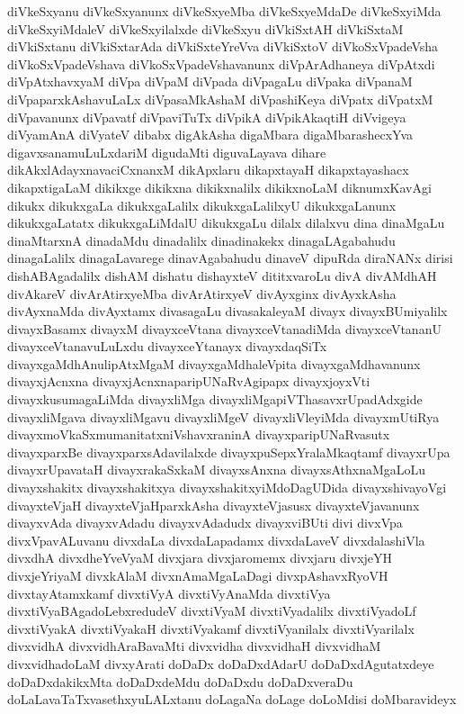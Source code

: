 {diVkeSxyanu
diVkeSxyanunx
diVkeSxyeMba
diVkeSxyeMdaDe
diVkeSxyiMda
diVkeSxyiMdaleV
diVkeSxyilalxde
diVkeSxyu
diVkiSxtAH
diVkiSxtaM
diVkiSxtanu
diVkiSxtarAda
diVkiSxteYreVva
diVkiSxtoV
diVkoSxVpadeVsha
diVkoSxVpadeVshava
diVkoSxVpadeVshavanunx
diVpArAdhaneya
diVpAtxdi
diVpAtxhavxyaM
diVpa
diVpaM
diVpada
diVpagaLu
diVpaka
diVpanaM
diVpaparxkAshavuLaLx
diVpasaMkAshaM
diVpashiKeya
diVpatx
diVpatxM
diVpavanunx
diVpavatf
diVpaviTuTx
diVpikA
diVpikAkaqtiH
diVvigeya
diVyamAnA
diVyateV
dibabx
digAkAsha
digaMbara
digaMbarashecxYva
digavxsanamuLuLxdariM
digudaMti
diguvaLayava
dihare
dikAkxlAdayxnavaciCxnanxM
dikApxlaru
dikapxtayaH
dikapxtayashacx
dikapxtigaLaM
dikikxge
dikikxna
dikikxnalilx
dikikxnoLaM
diknumxKavAgi
dikukx
dikukxgaLa
dikukxgaLalilx
dikukxgaLalilxyU
dikukxgaLanunx
dikukxgaLatatx
dikukxgaLiMdalU
dikukxgaLu
dilalx
dilalxvu
dina
dinaMgaLu
dinaMtarxnA
dinadaMdu
dinadalilx
dinadinakekx
dinagaLAgabahudu
dinagaLalilx
dinagaLavarege
dinavAgabahudu
dinaveV
dipuRda
diraNANx
dirisi
dishABAgadalilx
dishAM
dishatu
dishayxteV
dititxvaroLu
divA
divAMdhAH
divAkareV
divArAtirxyeMba
divArAtirxyeV
divAyxginx
divAyxkAsha
divAyxnaMda
divAyxtamx
divasagaLu
divasakaleyaM
divayx
divayxBUmiyalilx
divayxBasamx
divayxM
divayxceVtana
divayxceVtanadiMda
divayxceVtananU
divayxceVtanavuLuLxdu
divayxceYtanayx
divayxdaqSiTx
divayxgaMdhAnulipAtxMgaM
divayxgaMdhaleVpita
divayxgaMdhavanunx
divayxjAcnxna
divayxjAcnxnaparipUNaRvAgipapx
divayxjoyxVti
divayxkusumagaLiMda
divayxliMga
divayxliMgapiVThasavxrUpadAdxgide
divayxliMgava
divayxliMgavu
divayxliMgeV
divayxliVleyiMda
divayxmUtiRya
divayxmoVkaSxmumanitatxniVshavxraninA
divayxparipUNaRvasutx
divayxparxBe
divayxparxsAdavilalxde
divayxpuSepxYralaMkaqtamf
divayxrUpa
divayxrUpavataH
divayxrakaSxkaM
divayxsAnxna
divayxsAthxnaMgaLoLu
divayxshakitx
divayxshakitxya
divayxshakitxyiMdoDagUDida
divayxshivayoVgi
divayxteVjaH
divayxteVjaHparxkAsha
divayxteVjasusx
divayxteVjavanunx
divayxvAda
divayxvAdadu
divayxvAdadudx
divayxviBUti
divi
divxVpa
divxVpavALuvanu
divxdaLa
divxdaLapadamx
divxdaLaveV
divxdalashiVla
divxdhA
divxdheYveVyaM
divxjara
divxjaromemx
divxjaru
divxjeYH
divxjeYriyaM
divxkAlaM
divxnAmaMgaLaDagi
divxpAshavxRyoVH
divxtayAtamxkamf
divxtiVyA
divxtiVyAnaMda
divxtiVya
divxtiVyaBAgadoLebxredudeV
divxtiVyaM
divxtiVyadalilx
divxtiVyadoLf
divxtiVyakA
divxtiVyakaH
divxtiVyakamf
divxtiVyanilalx
divxtiVyarilalx
divxvidhA
divxvidhAraBavaMti
divxvidha
divxvidhaH
divxvidhaM
divxvidhadoLaM
divxyArati
doDaDx
doDaDxdAdarU
doDaDxdAgutatxdeye
doDaDxdakikxMta
doDaDxdeMdu
doDaDxdu
doDaDxveraDu
doLaLavaTaTxvasethxyuLALxtanu
doLagaNa
doLage
doLoMdisi
doMbaravideyx
}
